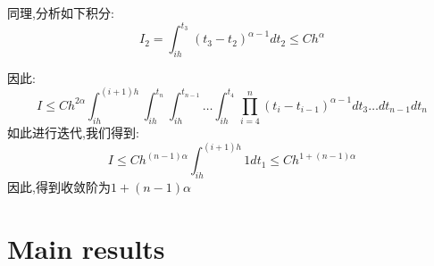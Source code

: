 \documentclass[12pt,final]{article}
\makeatletter
\numberwithin{equation}{section}
\numberwithin{figure}{section}
\numberwithin{table}{section}
\theoremstyle{plain}
\renewcommand{\proofname}{proof}
\theoremstyle{definition}
\theoremstyle{remark}
\renewenvironment{proof}[1][\proofname]{\par
	\pushQED{\qed}%
	\normalfont \topsep6\p@\@plus6\p@\relax
	\trivlist\item[\hskip\labelsep
	\bfseries #1\@addpunct{\,:\,}]\ignorespaces
}{%
	\popQED\endtrivlist\@endpefalse
}
\makeatother
\begin{document}
\begin{proof}
		同理,分析如下积分:
		\begin{equation*}
			I_{2} = \int_{ih}^{t_{3}}(t_{3}-t_{2})^{\alpha -1}
			dt_{2} \le Ch^\alpha 
		\end{equation*}
		
		因此:
		\begin{equation*}
			I \le Ch^{2\alpha}
			\int_{ih}^{(i+1)h}\int_{ih}^{t_n}\int_{ih}^{t_{n-1}} \ldots \int_{ih}^{t_{4}} 
			\prod_{i=4}^{n}(t_i-t_{i-1})^{\alpha -1} dt_{3} \ldots dt_{n-1}dt_n
		\end{equation*}
		如此进行迭代,我们得到:
		\begin{equation*}
			I \le Ch^{(n-1)\alpha}\int_{ih}^{(i+1)h} 1 dt_1 \le Ch^{1+(n-1)\alpha}
		\end{equation*}
		因此,得到收敛阶为$1+(n-1)\alpha$
	\end{proof}
	
	\section{Main results}
	
\end{document}
